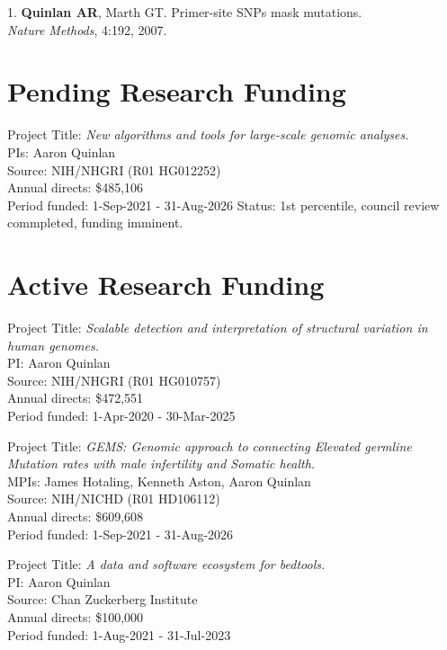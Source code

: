 \documentclass[margin,line]{cv}
\begin{document}
\begin{resume}
\begin{list}{*}{}
    \item[1.] \textbf{Quinlan AR}, Marth GT.
    Primer-site SNPs mask mutations.\\
    \textit{Nature Methods}, 4:192, 2007.

    \end{list}




    \section{\mysidestyle Pending Research Funding}

    Project Title: \textit{New algorithms and tools for large-scale genomic analyses.} \\
    PIs: Aaron Quinlan \\
    Source: NIH/NHGRI (R01 HG012252) \\
    Annual directs: \$485,106 \\
    Period funded: 1-Sep-2021 - 31-Aug-2026
    Status: 1st percentile, council review commpleted, funding imminent. 

    \section{\mysidestyle Active Research Funding}

    Project Title: \textit{Scalable detection and interpretation of structural variation in human genomes.} \\
    PI: Aaron Quinlan \\
    Source: NIH/NHGRI (R01 HG010757) \\
    Annual directs: \$472,551 \\
    Period funded: 1-Apr-2020 - 30-Mar-2025

    Project Title: \textit{GEMS: Genomic approach to connecting Elevated germline Mutation rates with male infertility and Somatic health.} \\
    MPIs: James Hotaling, Kenneth Aston, Aaron Quinlan \\
    Source: NIH/NICHD (R01 HD106112) \\
    Annual directs: \$609,608 \\
    Period funded: 1-Sep-2021 - 31-Aug-2026

    Project Title: \textit{A data and software ecosystem for bedtools.} \\
    PI: Aaron Quinlan \\
    Source: Chan Zuckerberg Institute \\
    Annual directs: \$100,000 \\
    Period funded: 1-Aug-2021 - 31-Jul-2023


\end{resume}
\end{document}
